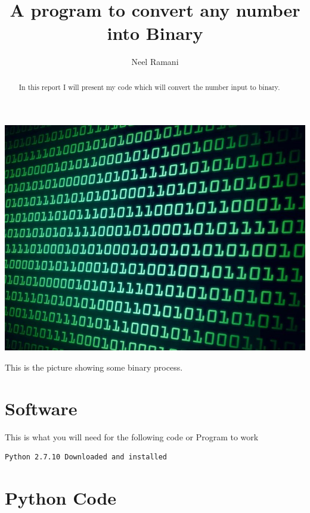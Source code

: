 \documentclass{tufte-handout}
\title{A program to convert any number into Binary}
\author[EF Academy]{Neel Ramani}
\begin{document}
\maketitle%
\begin{marginfigure}%
  \includegraphics[width=\linewidth]{binary.jpeg}
  \caption{This is the picture showing some binary process.}
  \label{fig:marginfig}
\end{marginfigure}
\begin{abstract}
\noindent
In this report I will present my code which will convert the number input to binary.
\end{abstract}

\normalsize

\vspace{1cm}
\section{Software}

This is what you will need for the following code or Program to work

\begin{shaded}
\begin{verbatim}
Python 2.7.10 Downloaded and installed
\end{verbatim}
\end{shaded}

\vspace{1cm}

\section{Python Code}
\end{document}
